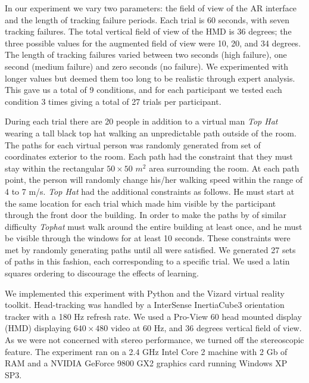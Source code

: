 \documentclass{acmsiggraph}                     %
\begin{document}
In our experiment we vary two parameters: the field of view of the AR interface and the length of tracking failure periods.  Each trial is 60 seconds, with seven tracking failures.  The total vertical field of view of the HMD is 36 degrees; the three possible values for the augmented field of view were 10, 20, and 34 degrees.  The length of tracking failures varied between two seconds (high failure), one second (medium failure) and zero seconds (no failure).  We experimented with longer values but deemed them too long to be realistic through expert analysis.  This gave us a total of 9 conditions, and for each participant we tested each condition 3 times giving a total of 27 trials per participant.

During each trial there are 20 people in addition to a virtual man \emph{Top Hat} wearing a tall black top hat walking an unpredictable path outside of the room.  The paths for each virtual person was randomly generated from set of coordinates exterior to the room.  Each path had the constraint that they must stay within the rectangular $50\times50$ $m^2$ area surrounding the room.  At each path point, the person will randomly change his/her walking speed within the range of 4 to 7 m/s.  \emph{Top Hat} had the additional constraints as follows.  He must start at the same location for each trial which made him visible by the participant through the front door the building.  In order to make the paths by of similar difficulty \emph{Tophat} must walk around the entire building at least once, and he must be visible through the windows for at least 10 seconds.  These constraints were met by randomly generating paths until all were satisfied.  We generated 27 sets of paths in this fashion, each corresponding to a specific trial.  We used a latin squares ordering to discourage the effects of learning.

We implemented this experiment with Python and the Vizard virtual reality toolkit.  Head-tracking was handled by a InterSense InertiaCube3 orientation tracker with a 180 Hz refresh rate.  We used a Pro-View 60 head mounted display (HMD) displaying $640\times480$ video at 60 Hz, and 36 degrees vertical field of view.  As we were not concerned with stereo performance, we turned off the stereoscopic feature.  The experiment ran on a 2.4 GHz Intel Core 2 machine with 2 Gb of RAM and a NVIDIA GeForce 9800 GX2 graphics card running Windows XP SP3.
\end{document}
